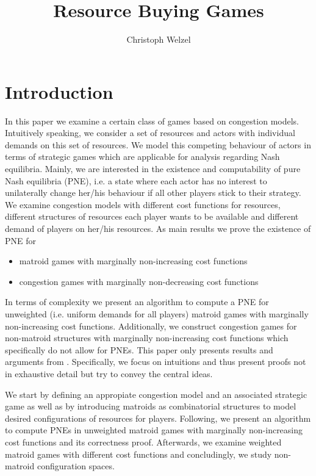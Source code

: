 \documentclass{scrartcl}
\title{Resource Buying Games}
\author{Christoph Welzel}
\theoremstyle{nonumberplain}
\begin{document}

\maketitle
\section{Introduction}
In this paper we examine a certain class of games based on congestion models.
Intuitively speaking, we consider a set of resources and actors with individual
demands on this set of resources. We model this competing behaviour of actors
in terms of strategic games which are applicable for analysis regarding
Nash equilibria. Mainly, we are interested in the existence and computability
of pure Nash equilibria (PNE), i.e. a state where each actor has no interest
to unilaterally change her/his behaviour if all other players stick to their
strategy. We examine congestion models with different cost functions for
resources, different structures of resources each player wants to be available
and different demand of players on her/his resources. As main results we prove
the existence of PNE for
\begin{itemize}
  \item matroid games with marginally non-increasing cost functions
  \item congestion games with marginally non-decreasing cost functions
\end{itemize}
In terms of complexity we present an algorithm to compute a PNE for unweighted
(i.e. uniform demands for all players) matroid games with marginally
non-increasing cost functions. Additionally, we construct congestion games for
non-matroid structures with marginally non-increasing cost functions which
specifically do not allow for PNEs. This paper only presents results and
arguments from \cite{main}. Specifically, we focus on intuitions and thus
present proofs not in exhaustive detail but try to convey the central ideas.

We start by defining an appropiate congestion model and an associated
strategic game as well as by introducing matroids as combinatorial structures
to model desired configurations of resources for players. Following, we present
an algorithm to compute PNEs in unweighted matroid games with marginally
non-increasing cost functions and its correctness proof.
Afterwards, we examine weighted matroid games with different cost functions
and concludingly, we study non-matroid configuration spaces.
\end{document}
